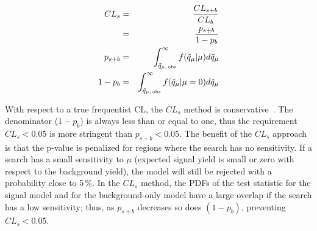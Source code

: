 \begin{eqnarray}
CL_s&=&\frac{CL_{s+b}}{CL_b}\label{eq:cls:a} \\
&=&\frac{p_{s+b}}{1-p_b}\label{eq:cls:b}\\
p_{s+b}&=& \int_{\tilde{q}_{\mu,\,\rm obs}}^{\infty} f(\tilde{q}_{\mu}|\mu) d\tilde{q}_{\mu} \label{eq:cls:c}\\
1-p_b&=& \int_{\tilde{q}_{\mu,\,\rm obs}}^{\infty} f(\tilde{q}_{\mu}|\mu=0) d\tilde{q}_{\mu}  \label{eq:cls:d}
\end{eqnarray}

With respect to a true frequentist CL, the $CL_s$ method is conservative~\cite{cls_stats}. The denominator ($1-p_b$) is always less than or equal to one, thus the requirement $CL_s<0.05$ is more stringent than $p_{s+b}<0.05$.  The benefit of the $CL_s$ approach is that the p-value is penalized for regions where the search has no sensitivity. If a search has a small sensitivity to $\mu$ (expected signal yield is small or zero with respect to the background yield), the model will still be rejected with a probability close to 5\,\%. In the $CL_s$ method, the PDFs of the test statistic for the signal model and for the background-only model have a large overlap if the search has a low sensitivity; thus, as $p_{s+b}$ decreases so does $(1-p_b)$, preventing $CL_s<0.05$. 







